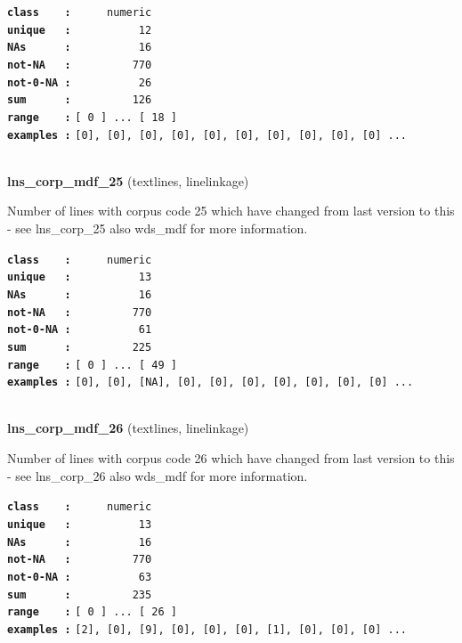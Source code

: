 \documentclass[]{article}
\begin{document}
\textbf{\texttt{class\ \ \ \ :}} \texttt{~~~~~numeric}\\
\textbf{\texttt{unique\ \ \ :}} \texttt{~~~~~~~~~~12}\\
\textbf{\texttt{NAs\ \ \ \ \ \ :}} \texttt{~~~~~~~~~~16}\\
\textbf{\texttt{not-NA\ \ \ :}} \texttt{~~~~~~~~~770}\\
\textbf{\texttt{not-0-NA\ :}} \texttt{~~~~~~~~~~26}\\
\textbf{\texttt{sum\ \ \ \ \ \ :}} \texttt{~~~~~~~~~126}\\
\textbf{\texttt{range\ \ \ \ :}}
\texttt{{[}\ 0\ {]}\ ...\ {[}\ 18\ {]}}\\
\textbf{\texttt{examples\ :}}
\texttt{{[}0{]},\ {[}0{]},\ {[}0{]},\ {[}0{]},\ {[}0{]},\ {[}0{]},\ {[}0{]},\ {[}0{]},\ {[}0{]},\ {[}0{]}\ ...}\\

~

\textbf{lns\_corp\_mdf\_25} (textlines, linelinkage)

Number of lines with corpus code 25 which have changed from last version
to this - see lns\_corp\_25 also wds\_mdf for more information.

\textbf{\texttt{class\ \ \ \ :}} \texttt{~~~~~numeric}\\
\textbf{\texttt{unique\ \ \ :}} \texttt{~~~~~~~~~~13}\\
\textbf{\texttt{NAs\ \ \ \ \ \ :}} \texttt{~~~~~~~~~~16}\\
\textbf{\texttt{not-NA\ \ \ :}} \texttt{~~~~~~~~~770}\\
\textbf{\texttt{not-0-NA\ :}} \texttt{~~~~~~~~~~61}\\
\textbf{\texttt{sum\ \ \ \ \ \ :}} \texttt{~~~~~~~~~225}\\
\textbf{\texttt{range\ \ \ \ :}}
\texttt{{[}\ 0\ {]}\ ...\ {[}\ 49\ {]}}\\
\textbf{\texttt{examples\ :}}
\texttt{{[}0{]},\ {[}0{]},\ {[}NA{]},\ {[}0{]},\ {[}0{]},\ {[}0{]},\ {[}0{]},\ {[}0{]},\ {[}0{]},\ {[}0{]}\ ...}\\

~

\textbf{lns\_corp\_mdf\_26} (textlines, linelinkage)

Number of lines with corpus code 26 which have changed from last version
to this - see lns\_corp\_26 also wds\_mdf for more information.

\textbf{\texttt{class\ \ \ \ :}} \texttt{~~~~~numeric}\\
\textbf{\texttt{unique\ \ \ :}} \texttt{~~~~~~~~~~13}\\
\textbf{\texttt{NAs\ \ \ \ \ \ :}} \texttt{~~~~~~~~~~16}\\
\textbf{\texttt{not-NA\ \ \ :}} \texttt{~~~~~~~~~770}\\
\textbf{\texttt{not-0-NA\ :}} \texttt{~~~~~~~~~~63}\\
\textbf{\texttt{sum\ \ \ \ \ \ :}} \texttt{~~~~~~~~~235}\\
\textbf{\texttt{range\ \ \ \ :}}
\texttt{{[}\ 0\ {]}\ ...\ {[}\ 26\ {]}}\\
\textbf{\texttt{examples\ :}}
\texttt{{[}2{]},\ {[}0{]},\ {[}9{]},\ {[}0{]},\ {[}0{]},\ {[}0{]},\ {[}1{]},\ {[}0{]},\ {[}0{]},\ {[}0{]}\ ...}\\
\end{document}
